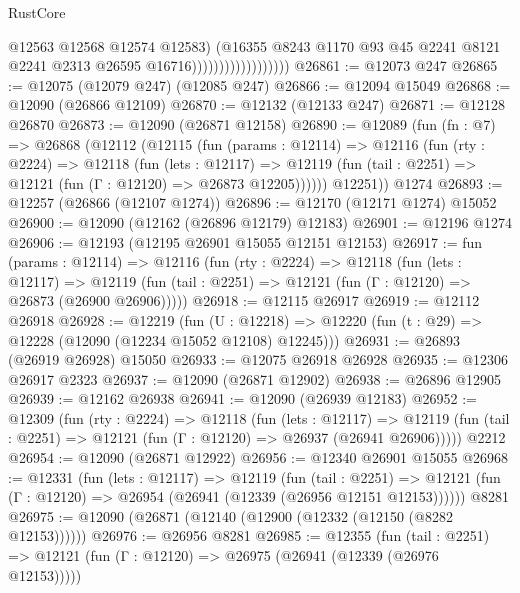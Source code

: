 \begin{lexlean}{RustCore}
\begin{coremodule}
                                        @12563
                                        @12568
                                        @12574
                                        @12583)
                                      (@16355
                                        @8243
                                        @1170
                                        @93
                                        @45
                                        @2241
                                        @8121
                                        @2241
                                        @2313
                                        @26595
                                        @16716))))))))))))))))))
@26861 := @12073 @247
@26865 := @12075 (@12079 @247) (@12085 @247)
@26866 := @12094 @15049
@26868 := @12090 (@26866 @12109)
@26870 := @12132 (@12133 @247)
@26871 := @12128 @26870
@26873 := @12090 (@26871 @12158)
@26890 := @12089
    (fun (fn : @7) =>
    @26868
      (@12112
        (@12115
          (fun (params : @12114) =>
          @12116
            (fun (rty : @2224) =>
            @12118
              (fun (lets : @12117) =>
              @12119 (fun (tail : @2251) => @12121 (fun (Γ : @12120) => @26873 @12205))))))
        @12251))
    @1274
@26893 := @12257 (@26866 (@12107 @1274))
@26896 := @12170 (@12171 @1274) @15052
@26900 := @12090 (@12162 (@26896 @12179) @12183)
@26901 := @12196 @1274
@26906 := @12193 (@12195 @26901 @15055 @12151 @12153)
@26917 := fun (params : @12114) =>
  @12116
    (fun (rty : @2224) =>
    @12118
      (fun (lets : @12117) =>
      @12119 (fun (tail : @2251) => @12121 (fun (Γ : @12120) => @26873 (@26900 @26906)))))
@26918 := @12115 @26917
@26919 := @12112 @26918
@26928 := @12219
    (fun (U : @12218) => @12220 (fun (t : @29) => @12228 (@12090 (@12234 @15052 @12108) @12245)))
@26931 := @26893 (@26919 @26928) @15050
@26933 := @12075 @26918 @26928
@26935 := @12306 @26917 @2323
@26937 := @12090 (@26871 @12902)
@26938 := @26896 @12905
@26939 := @12162 @26938
@26941 := @12090 (@26939 @12183)
@26952 := @12309
    (fun (rty : @2224) =>
    @12118
      (fun (lets : @12117) =>
      @12119 (fun (tail : @2251) => @12121 (fun (Γ : @12120) => @26937 (@26941 @26906)))))
    @2212
@26954 := @12090 (@26871 @12922)
@26956 := @12340 @26901 @15055
@26968 := @12331
    (fun (lets : @12117) =>
    @12119
      (fun (tail : @2251) =>
      @12121 (fun (Γ : @12120) => @26954 (@26941 (@12339 (@26956 @12151 @12153))))))
    @8281
@26975 := @12090 (@26871 (@12140 (@12900 (@12332 (@12150 (@8282 @12153))))))
@26976 := @26956 @8281
@26985 := @12355
    (fun (tail : @2251) => @12121 (fun (Γ : @12120) => @26975 (@26941 (@12339 (@26976 @12153)))))

\end{coremodule}
\end{lexlean}
